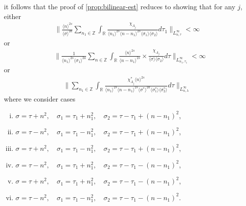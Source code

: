 \documentclass[12pt,reqno]{amsart}
\numberwithin{equation}{section}  %
\numberwithin{figure}{section}
\newcommand{\rr}{\mathbb{R}}
\newcommand{\zz}{\mathbb{Z}}
\theoremstyle{plain}
\theoremstyle{definition}
\theoremstyle{remark}
\begin{document}
%
%
it follows that the proof of \autoref{prop:bilinear-est} reduces to showing that
for any $j$, either 
%
%
\begin{equation}
  \label{sup-est-gen-per-1}
  \begin{split}
    \| \frac{ \langle n
    \rangle ^{2s}}{\langle \sigma \rangle ^{2a}}
    \sum_{n_{1} \in \zz} \int_{\rr} \frac{\chi_{A_{j}}}{ \langle n_{1} \rangle ^{2s} \langle n-n_{1} \rangle ^{2s} 
    \langle \sigma_{1} \rangle \langle  \sigma_{2} \rangle }
    d \tau_1  \|_{L^{\infty}_{n, \tau}} < \infty
  \end{split}
\end{equation}
%
%
or 
\begin{equation}
  \label{sup-est-gen-per-2}
\begin{split}
  & \| \frac{1}{\langle n_{1} \rangle ^{2s}
  \langle \sigma_{1} \rangle
  ^{2a}} \sum_{n \in \zz} \int_{\rr} \frac{\langle n \rangle ^{2s}}{\langle
  n - n_{1}\rangle ^{2s}}  \times \frac{\chi_{A_{j}}}{\langle
  \sigma \rangle  \langle \sigma_{2} \rangle } d \tau 
  \|_{L^{\infty}_{n_{1}, \tau_{1}}} < \infty
\end{split}
\end{equation}
%
or
\begin{equation}
  \label{sup-est-gen-per-3}
\begin{split}
  \| \sum_{n_{1} \in \zz} \int_{\rr} \frac{\chi^{*}_{A_{j}}
    \langle n \rangle ^{2s}
    }{ \langle n_{1} \rangle^{2s} \langle
    n-n_{1} \rangle ^{2s} \langle \sigma^{*}  
    \rangle ^{2a}
    \langle \sigma_{1}^{*} \rangle
    \langle  \sigma_{2}^{*} \rangle  } d \tau  \|_{L^{\infty}_{n, \lambda}}
\end{split}
\end{equation}
%
%
where we consider cases
\begin{enumerate}[(i)]
    \item $ \sigma=\tau+n^2,\quad \sigma_1=\tau_1+n_1^2,\quad \sigma_2=\tau -
      \tau_1+(n - n_1)^2$,
\label{it-1}
    \item $ \sigma=\tau-n^2,\quad \sigma_1=\tau_1-n_1^2,\quad \sigma_2=\tau - \tau_1+(n - n_1)^2$,
\label{it-2}
    \item  $\sigma=\tau+n^2,\quad \sigma_1=\tau_1-n_1^2,\quad \sigma_2=\tau - \tau_1+(n - n_1)^2$,
      \label{it-3}
    \item $\sigma=\tau-n^2,\quad \sigma_1=\tau_1+n_1^2,\quad \sigma_2=\tau - \tau_1-(n - n_1)^2$,
\label{it-4}
    \item $\sigma=\tau+n^2,\quad \sigma_1=\tau_1+n_1^2,\quad \sigma_2=\tau - \tau_1-(n - n_1)^2$,
\label{it-5}
    \item $\sigma=\tau-n^2,\quad \sigma_1=\tau_1-n_1^2,\quad \sigma_2=\tau - \tau_1-(n - n_1)^2$.
\label{it-6}
\end{enumerate}
\end{document}
